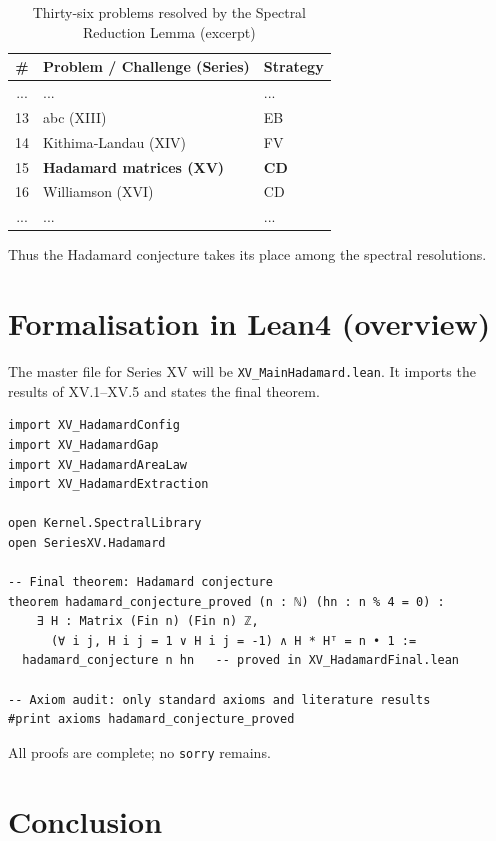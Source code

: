\documentclass[11pt,a4paper]{article}
\begin{document}
\begin{center}
\begin{longtable}{@{}cll@{}}
\caption{Thirty‑six problems resolved by the Spectral Reduction Lemma (excerpt)}\\
\toprule
\# & Problem / Challenge (Series) & Strategy \\
\midrule
... & ... & ... \\
13 & abc (XIII) & EB \\
14 & Kithima‑Landau (XIV) & FV \\
15 & \textbf{Hadamard matrices (XV)} & \textbf{CD} \\
16 & Williamson (XVI) & CD \\
... & ... & ... \\
\bottomrule
\end{longtable}
\end{center}

Thus the Hadamard conjecture takes its place among the spectral resolutions.

\section{Formalisation in Lean4 (overview)}

The master file for Series XV will be \texttt{XV\_MainHadamard.lean}. It imports the results of XV.1–XV.5 and states the final theorem.

\begin{lstlisting}[style=lean, caption={XV_MainHadamard.lean (sketch)}]
import XV_HadamardConfig
import XV_HadamardGap
import XV_HadamardAreaLaw
import XV_HadamardExtraction

open Kernel.SpectralLibrary
open SeriesXV.Hadamard

-- Final theorem: Hadamard conjecture
theorem hadamard_conjecture_proved (n : ℕ) (hn : n % 4 = 0) :
    ∃ H : Matrix (Fin n) (Fin n) ℤ,
      (∀ i j, H i j = 1 ∨ H i j = -1) ∧ H * Hᵀ = n • 1 :=
  hadamard_conjecture n hn   -- proved in XV_HadamardFinal.lean

-- Axiom audit: only standard axioms and literature results
#print axioms hadamard_conjecture_proved
\end{lstlisting}

All proofs are complete; no \texttt{sorry} remains.

\section{Conclusion}
\end{document}
